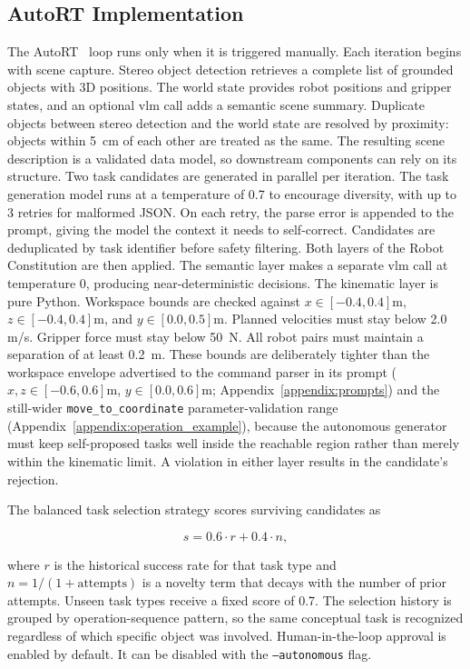 \documentclass[
     12pt,
     a4paper,
     BCOR=10mm,
     DIV=14,
     listof=totoc,
     bibliography=totoc,
     parskip,
     twoside,
     headsepline
     ]{scrreprt}
\begin{document}
\subsection{AutoRT Implementation}
The AutoRT~\cite{ahn2024autortembodiedfoundationmodels} loop runs only when it is triggered manually. Each iteration begins with scene capture. Stereo object detection retrieves a complete list of grounded objects with 3D positions. The world state provides robot positions and gripper states, and an optional \gls{vlm} call adds a semantic scene summary. Duplicate objects between stereo detection and the world state are resolved by proximity: objects within 5~cm of each other are treated as the same. The resulting scene description is a validated data model, so downstream components can rely on its structure.
Two task candidates are generated in parallel per iteration. The task generation model runs at a temperature of 0.7 to encourage diversity, with up to 3 retries for malformed JSON. On each retry, the parse error is appended to the prompt, giving the model the context it needs to self-correct. Candidates are deduplicated by task identifier before safety filtering. Both layers of the Robot Constitution are then applied. The semantic layer makes a separate \gls{vlm} call at temperature 0, producing near-deterministic decisions. The kinematic layer is pure Python. Workspace bounds are checked against $x \in [-0.4, 0.4]$m, $z \in [-0.4, 0.4]$m, and $y \in [0.0, 0.5]$m. Planned velocities must stay below 2.0 m/s. Gripper force must stay below 50~N. All robot pairs must maintain a separation of at least 0.2~m. These bounds are deliberately tighter than the workspace envelope advertised to the command parser in its prompt ($x,z \in [-0.6, 0.6]$m, $y \in [0.0, 0.6]$m; Appendix~\ref{appendix:prompts}) and the still-wider \texttt{move\_to\_coordinate} parameter-validation range (Appendix~\ref{appendix:operation_example}), because the autonomous generator must keep self-proposed tasks well inside the reachable region rather than merely within the kinematic limit. A violation in either layer results in the candidate's rejection.

The balanced task selection strategy scores surviving candidates as

\begin{equation}
	s = 0.6 \cdot r + 0.4 \cdot n,
\end{equation}

where $r$ is the historical success rate for that task type and $n = 1/(1 + \text{attempts})$ is a novelty term that decays with the number of prior attempts. Unseen task types receive a fixed score of 0.7. The selection history is grouped by operation-sequence pattern, so the same conceptual task is recognized regardless of which specific object was involved. Human-in-the-loop approval is enabled by default. It can be disabled with the \texttt{--autonomous} flag.
\end{document}
